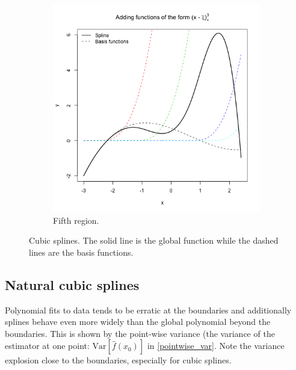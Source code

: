 \documentclass[12pt, letterpaper]{article}
\theoremstyle{definition}
\newcommand{\Var}{\mathrm{Var}}
\begin{document}
\begin{figure}\ContinuedFloat
\begin{subfigure}{0.49\textwidth}
\centering
\includegraphics[width=1\linewidth]{img/spline_cubic/100}
\caption{Fifth region.}
\end{subfigure}
\label{spline_cubic}
\caption{Cubic splines. The solid line is the global function while the dashed lines are the basis functions.}
\end{figure}

\subsection{Natural cubic splines}
Polynomial fits to data tends to be erratic at the boundaries and additionally splines behave even more widely than the global polynomial beyond the boundaries. This is shown by the point-wise variance (the variance of the estimator at one point: $\Var[\hat{f}(x_0)]$ in \ref{pointwise_var}. Note the variance explosion close to the boundaries, especially for cubic splines.
\end{document}
